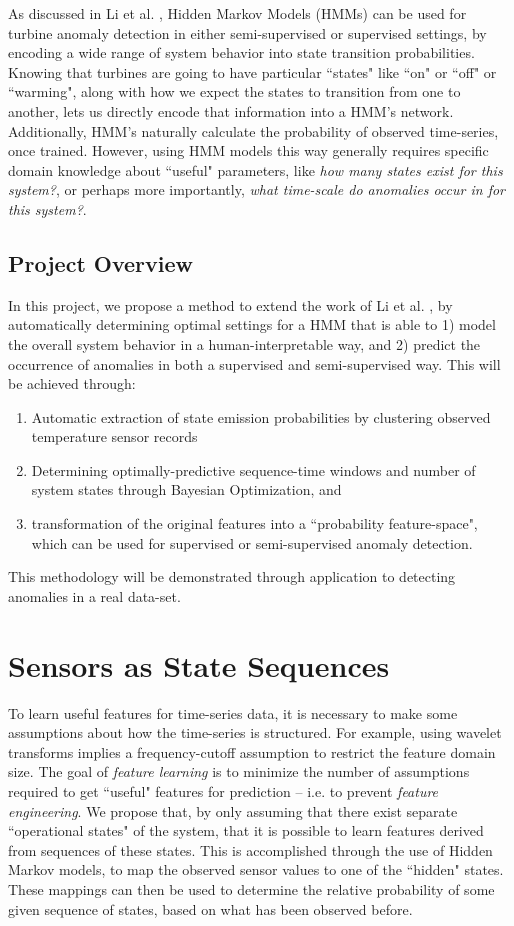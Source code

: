 \documentclass[twocolumn,10pt]{article}
\begin{document}
As discussed in Li et al. \cite{gas_turbine}, Hidden Markov Models (HMMs) can be used for turbine anomaly detection in either semi-supervised or supervised settings, by encoding a wide range of system behavior into state transition probabilities. Knowing that turbines are going to have particular ``states" like ``on" or ``off" or ``warming", along with how we expect the states to transition from one to another, lets us directly encode that information into a HMM's network. Additionally, HMM's naturally calculate the probability of observed time-series, once trained. However, using HMM models this way generally requires specific domain knowledge about ``useful" parameters, like \textit{how many states exist for this system?}, or perhaps more importantly, \textit{what time-scale do anomalies occur in for this system?}. 

\subsection{Project Overview}
In this project, we propose a method to extend the work of Li et al. \cite{gas_turbine}, by automatically determining optimal settings for a HMM that is able to 1) model the overall system behavior in a human-interpretable way, and 2) predict the occurrence of anomalies in both a supervised and semi-supervised way. 
This will be achieved through:
\begin{enumerate}
    \item Automatic extraction of state emission probabilities by clustering observed temperature sensor records
    \item Determining optimally-predictive sequence-time windows and number of system states through Bayesian Optimization, and
    \item transformation of the original features into a ``probability feature-space", which can be used for supervised or semi-supervised anomaly detection. 
\end{enumerate}

This methodology will be demonstrated through application to detecting anomalies in a real data-set.

\section{Sensors as State Sequences}
To learn useful features for time-series data, it is necessary to make some assumptions about how the time-series is structured. For example, using wavelet transforms \cite{yan2015} implies a frequency-cutoff assumption to restrict the feature domain size. The goal of \textit{feature learning} is to minimize the number of assumptions required to get ``useful" features for prediction -- i.e. to prevent \textit{feature engineering}. We propose that, by only assuming that there exist separate ``operational states" of the system, that it is possible to learn features derived from sequences of these states. This is accomplished through the use of Hidden Markov models, to map the observed sensor values to one of the ``hidden" states. These mappings can then be used to determine the relative probability of some given sequence of states, based on what has been observed before.
\end{document}
